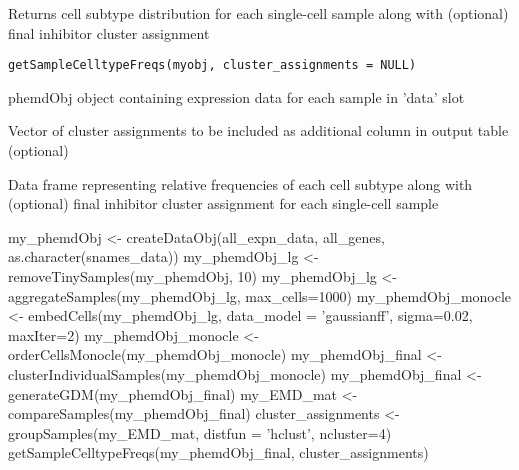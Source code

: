 \documentclass[a4paper]{book}
\begin{document}
%
\begin{Description}\relax
Returns cell subtype distribution for each single-cell sample along with (optional) final inhibitor cluster assignment
\end{Description}
%
\begin{Usage}
\begin{verbatim}
getSampleCelltypeFreqs(myobj, cluster_assignments = NULL)
\end{verbatim}
\end{Usage}
%
\begin{Arguments}
\begin{ldescription}
\item[\code{myobj}] phemdObj object containing expression data for each sample in 'data' slot

\item[\code{cluster\_assignments}] Vector of cluster assignments to be included as additional column in output table (optional)
\end{ldescription}
\end{Arguments}
%
\begin{Value}
Data frame representing relative frequencies of each cell subtype along with (optional) final inhibitor cluster assignment for each single-cell sample
\end{Value}
%
\begin{Examples}
\begin{ExampleCode}

my_phemdObj <- createDataObj(all_expn_data, all_genes, as.character(snames_data))
my_phemdObj_lg <- removeTinySamples(my_phemdObj, 10)
my_phemdObj_lg <- aggregateSamples(my_phemdObj_lg, max_cells=1000)
my_phemdObj_monocle <- embedCells(my_phemdObj_lg, data_model = 'gaussianff', sigma=0.02, maxIter=2)
my_phemdObj_monocle <- orderCellsMonocle(my_phemdObj_monocle)
my_phemdObj_final <- clusterIndividualSamples(my_phemdObj_monocle)
my_phemdObj_final <- generateGDM(my_phemdObj_final)
my_EMD_mat <- compareSamples(my_phemdObj_final)
cluster_assignments <- groupSamples(my_EMD_mat, distfun = 'hclust', ncluster=4)
getSampleCelltypeFreqs(my_phemdObj_final, cluster_assignments)

\end{ExampleCode}
\end{Examples}
\end{document}
